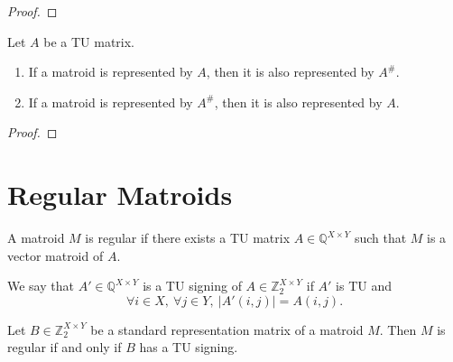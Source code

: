 \begin{proof}
    \leanok
    \SeeLean
\end{proof}

\begin{lemma}
    \label{Matrix.IsTotallyUnimodular.toMatroid_eq_support_toMatroid}
    \leanok
    Let $A$ be a TU matrix.
    \begin{enumerate}
        \item If a matroid is represented by $A$, then it is also represented by $A^{\#}$.
        \item If a matroid is represented by $A^{\#}$, then it is also represented by $A$.
    \end{enumerate}
\end{lemma}

\begin{proof}
    \leanok
    \SeeLean
\end{proof}


\section{Regular Matroids}

\begin{definition}
    \label{Matroid.IsRegular}
    \leanok
    A matroid $M$ is regular if there exists a TU matrix $A \in \mathbb{Q}^{X \times Y}$ such that $M$ is a vector matroid of $A$.
\end{definition}

\begin{definition}
    \label{Matrix.IsTuSigningOf}
    \leanok
    We say that $A' \in \mathbb{Q}^{X \times Y}$ is a TU signing of $A \in \mathbb{Z}_{2}^{X \times Y}$ if $A'$ is TU and
    \[
        \forall i \in X, \ \forall j \in Y, \ |A' (i, j)| = A (i, j).
    \]
\end{definition}


\begin{lemma}
    \label{StandardRepr.toMatroid_isRegular_iff_hasTuSigning}
    \leanok
    Let $B \in \mathbb{Z}_{2}^{X \times Y}$ be a standard representation matrix of a matroid $M$. Then $M$ is regular if and only if $B$ has a TU signing.
\end{lemma}

